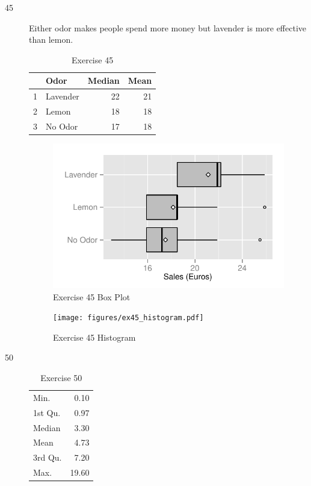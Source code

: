 \documentclass[letterpaper, landscape]{exam}
\begin{document}
\begin{description}
      \item[45]
        Either odor makes people spend more money but lavender is
        more effective than lemon.

        \begin{table}[H]
          \centering
          \begin{tabular}{rlrr}
            \toprule
              & Odor     & Median & Mean \\
            \midrule
            1 & Lavender & 22     & 21 \\
            2 & Lemon    & 18     & 18 \\
            3 & No Odor  & 17     & 18 \\
            \bottomrule
          \end{tabular}
          \caption{Exercise 45}
        \end{table}

        \begin{figure}[H]
          \centering
          \includegraphics{figures/ex45.pdf}
          \caption{Exercise 45 Box Plot}
        \end{figure}

        \begin{figure}[H]
          \centering
          \texttt{[image: figures/ex45\_histogram.pdf]}
          \caption{Exercise 45 Histogram}
        \end{figure}


      \item[50]
        \begin{table}[ht]
          \centering
          \begin{tabular}{lr}
            \toprule
            Min.    & 0.10 \\
            1st Qu. & 0.97 \\
            Median  & 3.30 \\
            Mean    & 4.73 \\
            3rd Qu. & 7.20 \\
            Max.    & 19.60 \\
            \bottomrule
          \end{tabular}
          \caption{Exercise 50}
        \end{table}


\end{description}
\end{document}
